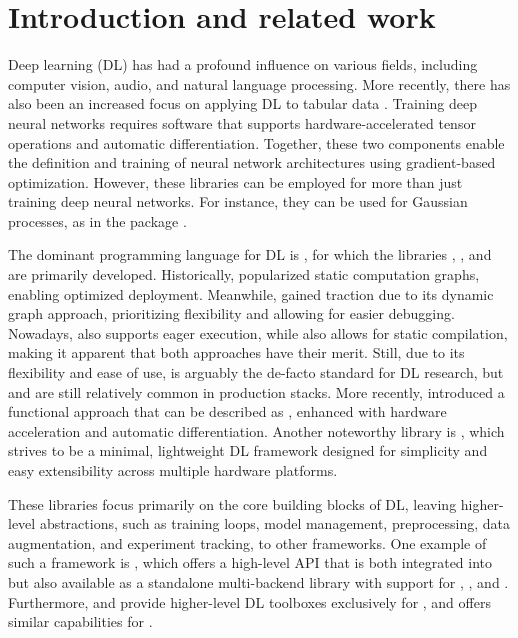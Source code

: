 \documentclass[article]{jss}
\theoremstyle{definition}
\begin{document}
%
%
%
%
%

\section{Introduction and related work}

Deep learning (DL) has had a profound influence on various fields, including computer vision, audio, and natural language processing.
More recently, there has also been an increased focus on applying DL to tabular data \citep{ref-borisov2022deep}.
Training deep neural networks requires software that supports hardware-accelerated tensor operations and automatic differentiation.
Together, these two components enable the definition and training of neural network architectures using gradient-based optimization.
However, these libraries can be employed for more than just training deep neural networks. For instance, they can be used for Gaussian processes, as in the  package \citep{gardner2018gpytorch}.

The dominant programming language for DL is \python{} \citep{ref-van1995python}, for which the libraries \tensorflow{} \citep{ref-abadi2016tensorflow}, \pytorch{} \citep{ref-pytorch}, and  \citep{ref-jax2018github} are primarily developed.
Historically, \tensorflow{} popularized static computation graphs, enabling optimized deployment. Meanwhile, \pytorch{} gained traction due to its dynamic graph approach, prioritizing flexibility and allowing for easier debugging.
Nowadays, \tensorflow{} also supports eager execution, while \pytorch{} also allows for static compilation, making it apparent that both approaches have their merit.
Still, due to its flexibility and ease of use, \pytorch{} is arguably the de-facto standard for DL research, but \tensorflow{} and  are still relatively common in production stacks.
More recently,  introduced a functional approach that can be described as  \citep{ref-harris2020array}, enhanced with hardware acceleration and automatic differentiation.
Another noteworthy \python{} library is  \citep{ref-tinygrad}, which strives to be a minimal, lightweight DL framework designed for simplicity and easy extensibility across multiple hardware platforms.

These libraries focus primarily on the core building blocks of DL, leaving higher-level abstractions, such as training loops, model management, preprocessing, data augmentation, and experiment tracking, to other frameworks.
One example of such a framework is  \citep{ref-chollet2018keras}, which offers a high-level API that is both integrated into \tensorflow{} but also available as a standalone multi-backend library with support for \pytorch{}, \tensorflow{}, and . Furthermore,  \citep{ref-lightning2019} and  provide higher-level DL toolboxes exclusively for \pytorch{}, and  \citep{ref-flax} offers similar capabilities for .
\end{document}
